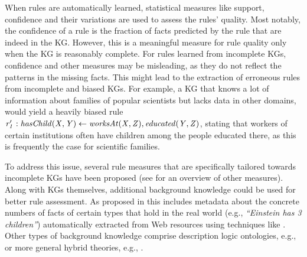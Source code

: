 When rules are automatically learned, statistical measures like support, confidence and their variations are used to assess the rules' quality. Most notably, the confidence of a rule is the fraction of facts predicted by the rule that are indeed in the KG. However, this is a meaningful measure for rule quality only when the KG is reasonably complete. For rules learned from incomplete KGs, confidence and other measures may be misleading, as they do not reflect the patterns in the missing facts. This might lead to the extraction of erroneous rules from incomplete and biased KGs. For example, a KG that knows a lot of information about families of popular scientists but lacks data in other domains, would yield a heavily biased rule $\mathit{r_1':hasChild(X,Y)\leftarrow worksAt(X,Z), educated(Y,Z)}$, stating that workers of certain institutions often have children among the people educated there, as this is frequently the case for scientific families. 

To address this issue, several rule measures that are specifically tailored towards incomplete KGs have been proposed \cite{amie,DBLP:conf/www/ZupancD18} (see \cite{metrics-summary,Azevedo2007} for an overview of other measures). 
Along with KGs themselves, additional background knowledge could be used for better rule assessment. As proposed in \cite{carl} this includes metadata about the concrete numbers of facts of certain types that hold in the real world (e.g., \emph{``Einstein has 3 children''}) automatically extracted from Web resources using techniques like  \cite{paramita-acl-2017}. Other types of background knowledge comprise description logic ontologies, e.g., \cite{d2016ontology} or more general hybrid theories, e.g., \cite{DBLP:journals/tplp/Lisi10,DBLP:journals/tplp/JozefowskaLL10}.

